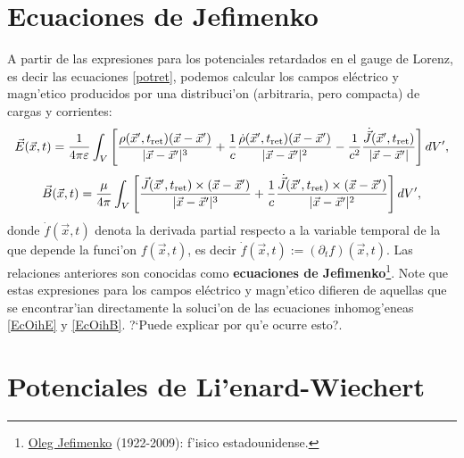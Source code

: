 \section{Ecuaciones de Jefimenko}
A partir de las expresiones para los potenciales retardados en el gauge de Lorenz, es decir las ecuaciones \eqref{potret}, podemos calcular los campos eléctrico y magn'etico producidos por una distribuci'on (arbitraria, pero compacta) de cargas y corrientes:
\begin{equation}
\vec{E}(\vec{x},t)=\frac{1}{4\pi\varepsilon}\int_V \left[  \frac{\rho(\vec{x}',t_{\rm ret})(\vec{x}-\vec{x}')}{\vert \vec{x}-\vec{x}' \vert^3} + \frac{1}{c}\frac{ \dot\rho(\vec{x}',t_{\rm ret})(\vec{x}-\vec{x}')}{\vert\vec{x}-\vec{x}'\vert^2} -\frac{1}{c^2}\frac{\dot{\vec{J}} (\vec{x}',t_{\rm ret})}{\vert\vec{x}-\vec{x}' \vert} \right] dV',
\end{equation}
\begin{equation}
\vec{B}(\vec{x},t)=\frac{\mu}{4\pi} \int_V\left[
\frac{\vec{J}(\vec{x}',t_{\rm ret})\times(\vec{x}-\vec{x}')}{\vert \vec{x}-\vec{x}'\vert^3}+ \frac{1}{c}\frac{ \dot{\vec{J}}(\vec{x}',t_{\rm ret})\times(\vec{x}-\vec{x}')}{\vert\vec{x}-\vec{x}' \vert^2} \right]dV', \label{b3}
\end{equation}
donde $\dot{f}(\vec{x},t)$ denota la derivada partial respecto a la variable temporal de la que depende la funci'on $f(\vec{x},t)$, es decir $\dot{f}(\vec{x},t):=(\partial_t f)(\vec{x},t)$. Las relaciones anteriores son conocidas como \textbf{ecuaciones de Jefimenko}\footnote{\href{http://en.wikipedia.org/wiki/Jefimenko}{Oleg Jefimenko} (1922-2009): f'isico estadounidense.}. Note que estas expresiones para los campos eléctrico y magn'etico difieren de aquellas que se encontrar'ian directamente la soluci'on de las ecuaciones inhomog'eneas \eqref{EcOihE} y \eqref{EcOihB}. ?`Puede explicar por qu'e ocurre esto?.


\section{Potenciales de Li'enard-Wiechert}

